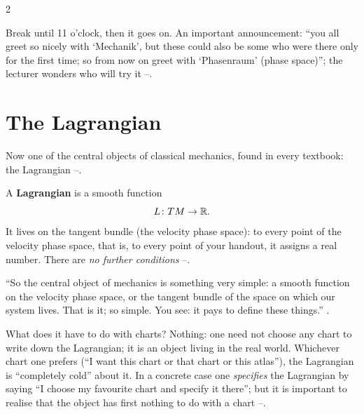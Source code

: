 \begin{paracol}{2}
\begin{coursenote}\label{cn:lag-break}
Break until 11 o'clock, then it goes on. An important announcement: ``you all greet so nicely with `Mechanik', but these could also be some who were there only for the first time; so from now on greet with `Phasenraum' (phase space)''; the lecturer wonders who will try it --.
\end{coursenote}

\section{The Lagrangian}\label{sec:lag-L}

Now one of the central objects of classical mechanics, found in every textbook: the Lagrangian --.

\begin{definition}\label{def:lag-L}
A \textbf{Lagrangian} is a smooth function
\begin{equation}\label{eq:lag-L}
  L\colon TM\to\mathbb{R} .
\end{equation}
It lives on the tangent bundle (the velocity phase space): to every point of the velocity phase space, that is, to every point of your handout, it assigns a real number. There are \emph{no further conditions} --.
\end{definition}
``So the central object of mechanics is something very simple: a smooth function on the velocity phase space, or the tangent bundle of the space on which our system lives. That is it; so simple. You see: it pays to define these things.'' .

\begin{coursenote}\label{cn:lag-chartfree}
What does it have to do with charts? Nothing: one need not choose any chart to write down the Lagrangian; it is an object living in the real world. Whichever chart one prefers (``I want this chart or that chart or this atlas''), the Lagrangian is ``completely cold'' about it. In a concrete case one \emph{specifies} the Lagrangian by saying ``I choose my favourite chart and specify it there''; but it is important to realise that the object has first nothing to do with a chart --.
\end{coursenote}


\end{paracol}
